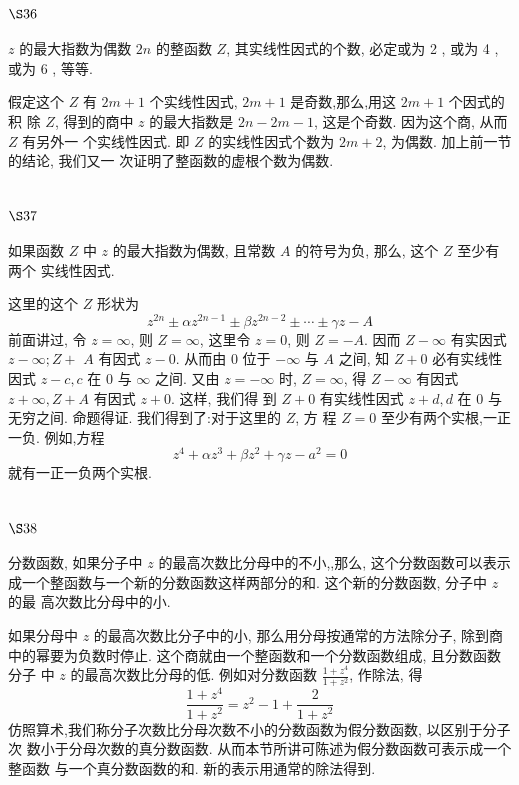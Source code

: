\section{$\S 36$}

$z$ 的最大指数为偶数 $2 n$ 的整函数 $Z$, 其实线性因式的个数, 必定或为 2 , 或为 4 , 或为 6 , 等等.

假定这个 $Z$ 有 $2 m+1$ 个实线性因式, $2 m+1$ 是奇数,那么,用这 $2 m+1$ 个因式的积 除 $Z$, 得到的商中 $z$ 的最大指数是 $2 n-2 m-1$, 这是个奇数. 因为这个商, 从而 $Z$ 有另外一 个实线性因式. 即 $Z$ 的实线性因式个数为 $2 m+2$, 为偶数. 加上前一节的结论, 我们又一 次证明了整函数的虚根个数为偶数.

\section{$\S 37$}

如果函数 $Z$ 中 $z$ 的最大指数为偶数, 且常数 $A$ 的符号为负, 那么, 这个 $Z$ 至少有两个 实线性因式.

这里的这个 $Z$ 形状为
\[
z^{2 n} \pm \alpha z^{2 n-1} \pm \beta z^{2 n-2} \pm \cdots \pm \gamma z-A
\]
前面讲过, 令 $z=\infty$, 则 $Z=\infty$, 这里令 $z=0$, 则 $Z=-A$. 因而 $Z-\infty$ 有实因式 $z-\infty ; Z+$ $A$ 有因式 $z-0$. 从而由 0 位于 $-\infty$ 与 $A$ 之间, 知 $Z+0$ 必有实线性因式 $z-c, c$ 在 0 与 $\infty$ 之间. 又由 $z=-\infty$ 时, $Z=\infty$, 得 $Z-\infty$ 有因式 $z+\infty, Z+A$ 有因式 $z+0$. 这样, 我们得 到 $Z+0$ 有实线性因式 $z+d, d$ 在 0 与无穷之间. 命题得证. 我们得到了:对于这里的 $Z$, 方 程 $Z=0$ 至少有两个实根,一正一负. 例如,方程
\[
z^{4}+\alpha z^{3}+\beta z^{2}+\gamma z-a^{2}=0
\]
就有一正一负两个实根.

\section{$\S 38$}

分数函数, 如果分子中 $z$ 的最高次数比分母中的不小,,那么, 这个分数函数可以表示 成一个整函数与一个新的分数函数这样两部分的和. 这个新的分数函数, 分子中 $z$ 的最 高次数比分母中的小.

如果分母中 $z$ 的最高次数比分子中的小, 那么用分母按通常的方法除分子, 除到商 中的幂要为负数时停止. 这个商就由一个整函数和一个分数函数组成, 且分数函数分子 中 $z$ 的最高次数比分母的低. 例如对分数函数 $\frac{1+z^{4}}{1+z^{2}}$, 作除法, 得 
\[
\frac{1+z^{4}}{1+z^{2}}=z^{2}-1+\frac{2}{1+z^{2}}
\]
仿照算术,我们称分子次数比分母次数不小的分数函数为假分数函数, 以区别于分子次 数小于分母次数的真分数函数. 从而本节所讲可陈述为假分数函数可表示成一个整函数 与一个真分数函数的和. 新的表示用通常的除法得到.

